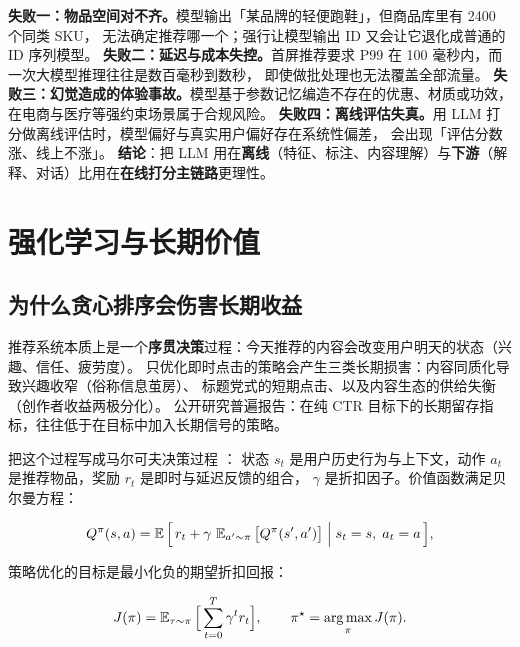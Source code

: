 \begin{pitfall}
\textbf{失败一：物品空间对不齐。}模型输出「某品牌的轻便跑鞋」，但商品库里有 2400 个同类 SKU，
无法确定推荐哪一个；强行让模型输出 ID 又会让它退化成普通的 ID 序列模型。
\textbf{失败二：延迟与成本失控。}首屏推荐要求 P99 在 100 毫秒内，而一次大模型推理往往是数百毫秒到数秒，
即使做批处理也无法覆盖全部流量。
\textbf{失败三：幻觉造成的体验事故。}模型基于参数记忆编造不存在的优惠、材质或功效，
在电商与医疗等强约束场景属于合规风险。
\textbf{失败四：离线评估失真。}用 LLM 打分做离线评估时，模型偏好与真实用户偏好存在系统性偏差，
会出现「评估分数涨、线上不涨」。
\textbf{结论}：把 LLM 用在\textbf{离线}（特征、标注、内容理解）与\textbf{下游}（解释、对话）比用在\textbf{在线打分主链路}更理性。
\end{pitfall}

\section{强化学习与长期价值}

\subsection{为什么贪心排序会伤害长期收益}

推荐系统本质上是一个\textbf{序贯决策}过程：今天推荐的内容会改变用户明天的状态（兴趣、信任、疲劳度）。
只优化即时点击的策略会产生三类长期损害：内容同质化导致兴趣收窄（俗称信息茧房）、
标题党式的短期点击、以及内容生态的供给失衡（创作者收益两极分化）。
公开研究普遍报告：在纯 CTR 目标下的长期留存指标，往往低于在目标中加入长期信号的策略。

把这个过程写成马尔可夫决策过程 \cite{robbins1951stochastic}：
状态 $s_t$ 是用户历史行为与上下文，动作 $a_t$ 是推荐物品，奖励 $r_t$ 是即时与延迟反馈的组合，
$\gamma$ 是折扣因子。价值函数满足贝尔曼方程：

\begin{equation}
Q^{\pi}(s, a) = \operatorname{\mathbb{E}}\Big[\, r_t + \gamma \, \operatorname{\mathbb{E}}_{a' \sim \pi}\big[ Q^{\pi}(s', a') \big] \;\Big|\; s_t = s,\; a_t = a \,\Big],
\label{eq:bellman}
\end{equation}

策略优化的目标是最小化负的期望折扣回报：

\begin{equation}
J(\pi) = \operatorname{\mathbb{E}}_{\tau \sim \pi}\Big[ \sum_{t=0}^{T} \gamma^{t} r_t \Big],
\qquad \pi^{\star} = \operatorname*{arg\,max}_{\pi} J(\pi) .
\label{eq:rl-obj}
\end{equation}

